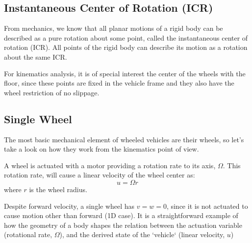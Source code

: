 \subsection{Instantaneous Center of Rotation (ICR)}
From mechanics, we know that all planar motions of a rigid body can be described as a pure rotation about some point, called the instantaneous center of rotation (ICR). All points of the rigid body can describe its motion as a rotation about the same ICR. 

For kinematics analysis, it is of special interest the center of the wheels with the floor, since these points are fixed in the vehicle frame and they also have the wheel restriction of no slippage. 


\subsection{Single Wheel}
\label{subsec:single_wheel}
The most basic mechanical element of wheeled vehicles are their wheels, so let's take a look on how they work from the kinematics point of view.

A wheel is actuated with a motor providing a rotation rate to its axis, $\Omega$. This rotation rate, will cause a linear velocity of the wheel center as: 
\begin{equation}
 u = \Omega r
\end{equation}
where $r$ is the wheel radius. 

Despite forward velocity, a single wheel has $v = w = 0$, since it is not actuated to cause motion other than forward (1D case). It is a straightforward example of how the geometry of a body shapes the relation between the actuation variable (rotational rate, $\Omega$), and the derived state of the `vehicle` (linear velocity, $u$)


